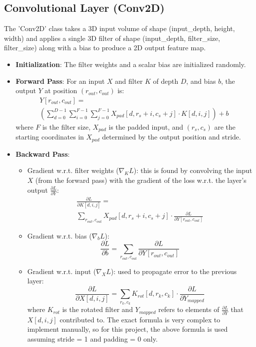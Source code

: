 \documentclass[conference]{IEEEtran}
\begin{document}
\subsection{Convolutional Layer (Conv2D)}
The 'Conv2D' class takes a 3D input volume of shape (input\_depth, height, width) and applies a single 3D filter of shape (input\_depth, filter\_size, filter\_size) along with a bias to produce a 2D output feature map.
\begin{itemize}
    \item \textbf{Initialization}: The filter weights and a scalar bias are initialized randomly.
    \item \textbf{Forward Pass}: For an input $X$ and filter $K$ of depth $D$, and bias $b$, the output $Y$ at position $(r_{out}, c_{out})$ is:
    \begin{multline*}
    Y[r_{out}, c_{out}] = \\
    \left( \sum_{d=0}^{D-1} \sum_{i=0}^{F-1} \sum_{j=0}^{F-1} X_{pad}[d, r_{s} + i, c_{s} + j] \cdot K[d, i, j] \right) + b
    \end{multline*}
    where $F$ is the filter size, $X_{pad}$ is the padded input, and $(r_s, c_s)$ are the starting coordinates in $X_{pad}$ determined by the output position and stride.
    \item \textbf{Backward Pass}:
        \begin{itemize}
            \item Gradient w.r.t. filter weights ($\nabla_K L$): this is found by convolving the input $X$ (from the forward pass) with the gradient of the loss w.r.t. the layer's output $\frac{\partial L}{\partial Y}$:
            \begin{multline*}
            \frac{\partial L}{\partial K[d,i,j]} = \\
            \sum_{r_{out}, c_{out}} X_{pad}[d, r_{s}+i, c_{s}+j] \cdot \frac{\partial L}{\partial Y[r_{out},c_{out}]} 
            \end{multline*}
            \item Gradient w.r.t. bias ($\nabla_b L$):
            \[ \frac{\partial L}{\partial b} = \sum_{r_{out}, c_{out}} \frac{\partial L}{\partial Y[r_{out},c_{out}]} \]
            \item Gradient w.r.t. input ($\nabla_X L$): used to propagate error to the previous layer:
            \[ \frac{\partial L}{\partial X[d,i,j]} = \sum_{r_k,c_k} K_{rot}[d,r_k,c_k] \cdot \frac{\partial L}{\partial Y_{mapped}} \]
            where $K_{rot}$ is the rotated filter and $Y_{mapped}$ refers to elements of $\frac{\partial L}{\partial Y}$ that $X[d,i,j]$ contributed to. The exact formula is very complex to implement manually, so for this project, the above formula is used assuming stride = 1 and padding = 0 only.
        \end{itemize}
\end{itemize}
\end{document}
